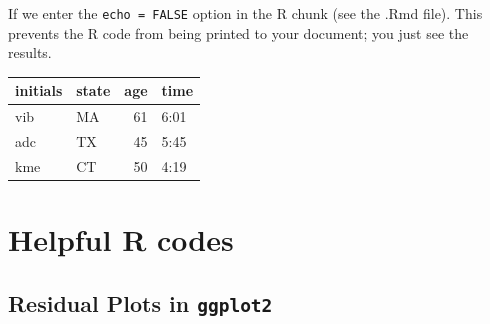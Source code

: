 \documentclass[
]{book}
\begin{document}
If we enter the \texttt{echo\ =\ FALSE} option in the R chunk (see the .Rmd file). This prevents the R code from being printed to your document; you just see the results.

\begin{tabular}{l|l|r|l}
\hline
initials & state & age & time\\
\hline
vib & MA & 61 & 6:01\\
\hline
adc & TX & 45 & 5:45\\
\hline
kme & CT & 50 & 4:19\\
\hline
\end{tabular}

\hypertarget{helpful-r-codes}{%
\chapter{Helpful R codes}\label{helpful-r-codes}}

\hypertarget{residual-plots-in-ggplot2}{%
\section{\texorpdfstring{Residual Plots in \texttt{ggplot2}}{Residual Plots in ggplot2}}\label{residual-plots-in-ggplot2}}
\end{document}
